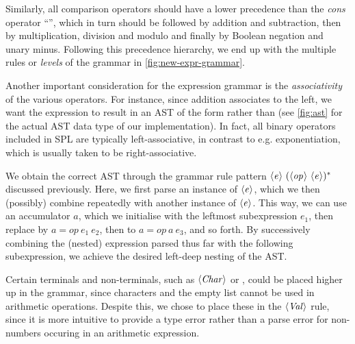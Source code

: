 Similarly, all comparison operators should have a lower precedence than the
\emph{cons} operator ``\code{:}'', which in turn should be followed by addition
and subtraction, then by multiplication, division and modulo and finally by
Boolean negation and unary minus.
Following this precedence hierarchy, we end up with the multiple rules or
\emph{levels} of the grammar in \cref{fig:new-expr-grammar}.

Another important consideration for the expression grammar is the
\emph{associativity} of the various operators. For instance, since addition
associates to the left, we want the expression  to result in an AST
of the form  rather than  (see
\cref{fig:ast} for the actual AST data type of our implementation).
In fact, all binary operators included in SPL are typically left-associative, in
contrast to e.g. exponentiation, which is usually taken to be right-associative.

We obtain the correct AST through the grammar rule pattern
$\langle \textit{e}\kern.7pt \rangle\ (\langle \textit{op}\kern.7pt \rangle\ \langle \textit{e}\kern.7pt \rangle)^*$ discussed previously.
Here, we first parse an instance of $\langle \textit{e}\kern.7pt \rangle$, which we then (possibly) combine
repeatedly with another instance of $\langle \textit{e}\kern.7pt \rangle$. This way, we can use an
accumulator $a$, which we initialise with the leftmost subexpression
$e_1$, then replace by $a = op\ e_1\ e_2$, then to $a = op\ a\ e_3$, and so
forth. By successively combining the (nested) expression parsed thus far with
the following subexpression, we achieve the desired left-deep nesting of the
AST.

Certain terminals and non-terminals, such as $\langle \textit{Char}\kern.7pt \rangle$ or \code{[]}, could be
placed higher up in the grammar, since characters and the empty list cannot be
used in arithmetic operations. Despite this, we chose to place these in the
$\langle \textit{Val}\kern.7pt \rangle$ rule, since it is more intuitive to provide a type error rather than
a parse error for non-numbers occuring in an arithmetic expression.


